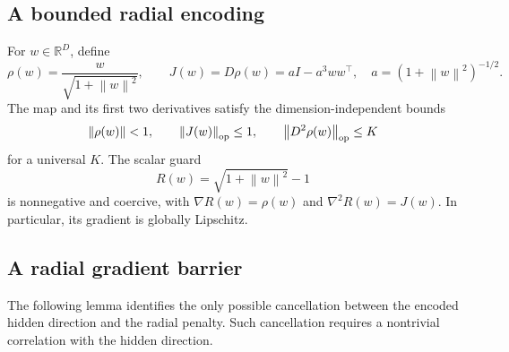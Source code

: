 \documentclass[11pt]{article}
\newcommand{\R}{\mathbb R}
\newcommand{\norm}[1]{\left\lVert #1\right\rVert}
\theoremstyle{definition}
\theoremstyle{remark}
\begin{document}
\subsection{A bounded radial encoding}
For \(w\in\R^D\), define
\begin{equation}\label{eq:rho}
 \rho(w)=\frac{w}{\sqrt{1+\norm w^2}},
 \qquad J(w)=D\rho(w)
 =aI-a^3ww^\top,
 \quad a=(1+\norm w^2)^{-1/2}.
\end{equation}
The map and its first two derivatives satisfy the dimension-independent
bounds
\begin{equation}\label{eq:rho-bounds}
 \norm{\rho(w)}<1,
 \qquad \norm{J(w)}_{\rm op}\le1,
 \qquad \norm{D^2\rho(w)}_{\rm op}\le K
\end{equation}
for a universal \(K\).  The scalar guard
\begin{equation}\label{eq:guard}
 R(w)=\sqrt{1+\norm w^2}-1
\end{equation}
is nonnegative and coercive, with $\nabla R(w)=\rho(w)$ and
$\nabla^2R(w)=J(w)$. In particular, its gradient is globally Lipschitz.

\subsection{A radial gradient barrier}
The following lemma identifies the only possible cancellation between the
encoded hidden direction and the radial penalty. Such cancellation requires
a nontrivial correlation with the hidden direction.
\end{document}
